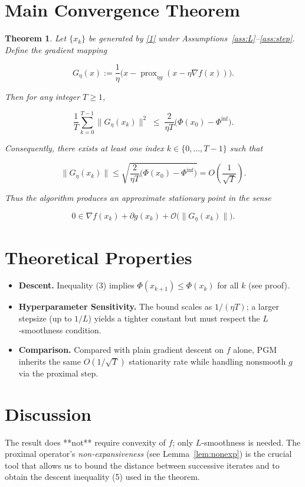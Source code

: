 \documentclass{article}
\newtheorem{theorem}{Theorem}
\newcommand{\prox}{\operatorname{prox}}
\newcommand{\grad}{\nabla}
\begin{document}
\section*{Main Convergence Theorem}
\begin{theorem}\label{thm:main}
Let $\{x_{k}\}$ be generated by \eqref{1} under Assumptions~\ref{ass:L}–\ref{ass:step}.  
Define the \emph{gradient mapping}  

\[
G_{\eta}(x):=\frac{1}{\eta}\bigl(x-\prox_{\eta g}(x-\eta\grad f(x))\bigr).
\]

Then for any integer $T\ge1$,

\[
\frac{1}{T}\sum_{k=0}^{T-1}\|G_{\eta}(x_{k})\|^{2}
\;\le\;
\frac{2}{\eta T}\bigl(\Phi(x_{0})-\Phi^{\inf}\bigr). \tag{3}
\]

Consequently, there exists at least one index $k\in\{0,\dots,T-1\}$ such that  

\[
\|G_{\eta}(x_{k})\|\le
\sqrt{\frac{2}{\eta T}\bigl(\Phi(x_{0})-\Phi^{\inf}\bigr)}=
O\!\left(\frac{1}{\sqrt{T}}\right). \tag{4}
\]

Thus the algorithm produces an \emph{approximate stationary point} in the sense  

\[
0\in\grad f(x_{k})+\partial g(x_{k})+ \mathcal{O}\!\bigl(\|G_{\eta}(x_{k})\|\bigr).
\]
\end{theorem}

\section*{Theoretical Properties}
\begin{itemize}[nosep]
\item \textbf{Descent.}  Inequality (3) implies $\Phi(x_{k+1})\le\Phi(x_{k})$ for all $k$ (see proof).
\item \textbf{Hyperparameter Sensitivity.} The bound scales as $1/(\eta T)$; a larger stepsize (up to $1/L$) yields a tighter constant but must respect the $L$‑smoothness condition.
\item \textbf{Comparison.} Compared with plain gradient descent on $f$ alone, PGM inherits the same $O(1/\sqrt{T})$ stationarity rate while handling nonsmooth $g$ via the proximal step.
\end{itemize}

\section*{Discussion}
The result does **not** require convexity of $f$; only $L$‑smoothness is needed. The proximal operator’s \emph{non‑expansiveness} (see Lemma~\ref{lem:nonexp}) is the crucial tool that allows us to bound the distance between successive iterates and to obtain the descent inequality (5) used in the theorem.
\end{document}
